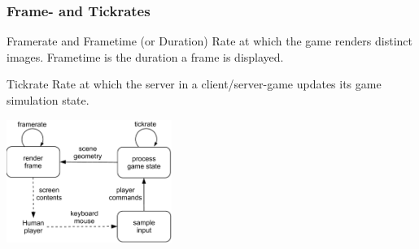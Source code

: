 \documentclass{UDEbeamerEN}
\begin{document}
\begin{frame}
	\frametitle{Frame- and Tickrates}

	\vspace{-2mm}

	\begin{block}{Framerate and Frametime (or Duration)}
		Rate at which the game renders distinct images. Frametime is the duration a frame is displayed.
	\end{block}

	\pause
	\begin{block}{Tickrate}
		Rate at which the server in a client/server-game updates its game simulation state.
	\end{block}

	\pause
	\begin{center}
		\includegraphics[height=4cm]{../../../models/game_loop.pdf}
	\end{center}



\end{frame}
\end{document}
